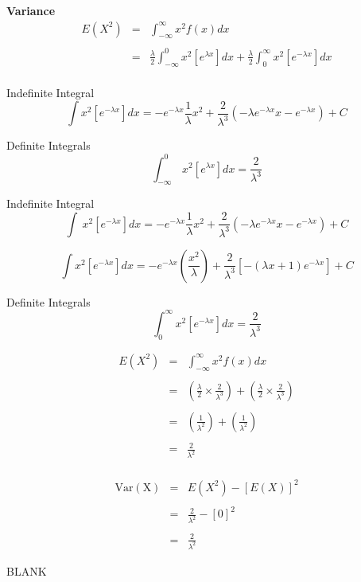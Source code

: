 \documentclass[a4paper,12pt]{article}
\begin{document}
	\newpage
	\noindent \textbf{Variance}\\
	\begin{eqnarray*}
		E(X^2) &=& \int^{\infty}_{-\infty} x^2 f(x) dx \\
		& & \\
		&=&  \frac{\lambda}{2}\int^{0}_{-\infty} x^2 \left[e^{\lambda x}\right] dx +  \frac{\lambda}{2}\int^{\infty}_{0} x^2 \left[e^{-\lambda x}\right] dx  \\
	\end{eqnarray*}
	
	\begin{framed}
		Indefinite Integral
		\[\int x^2\left[e^{-\lambda x}\right]dx=-e^{-\lambda x}\frac{1}{\lambda}x^2+\frac{2}{\lambda^3}\left(-\lambda e^{-\lambda x}x-e^{-\lambda x}\right)+C\]
		
		Definite Integrals
		\[\int _{-\infty \:}^0x^2\left[e^{\lambda x}\right]dx=\frac{2}{\lambda ^3}\]
	\end{framed}
	
	
	\begin{framed}
		Indefinite Integral
		\[ \int \:x^2\left[e^{-\lambda x}\right]dx=-e^{-\lambda x}\frac{1}{\lambda}x^2+\frac{2}{\lambda^3}\left(-\lambda e^{-\lambda x}x-e^{-\lambda x}\right)+C\]
		
		\[\int x^2\left[e^{-\lambda x}\right]dx=-e^{-\lambda x}\left( \frac{x^2}{\lambda} \right) + \frac{2}{\lambda^3}\left[ -(\lambda x +1)e^{-\lambda x}\right] + C\]
		
		Definite Integrals
		\[\int^{\infty}_{0}x^2\left[e^{-\lambda x}\right]dx=\frac{2}{\lambda ^3}\]
	\end{framed}
	
	\begin{eqnarray*}
		E(X^2) &=& \int^{\infty}_{-\infty} x^2 f(x) dx \\
		& & \\
		&=& \left( \frac{\lambda}{2} \times \frac{2}{\lambda ^3} \right) + \left( \frac{\lambda}{2} \times \frac{2}{\lambda ^3}\right)\\
		& & \\
		&=& \left(  \frac{1}{\lambda ^2} \right) + \left(  \frac{1}{\lambda ^2} \right)\\
		& & \\
		&=&  \frac{2}{\lambda ^2} \\
	\end{eqnarray*}
	
	\begin{eqnarray*}
		\operatorname{Var(X)} &=& E(X^2) - [E(X)]^2\\
		& & \\
		&=&  \frac{2}{\lambda ^2} - [0]^{2} \\
		& & \\
		&=&  \frac{2}{\lambda ^2}
	\end{eqnarray*}
	
	\newpage
	BLANK
	
	
\end{document}
